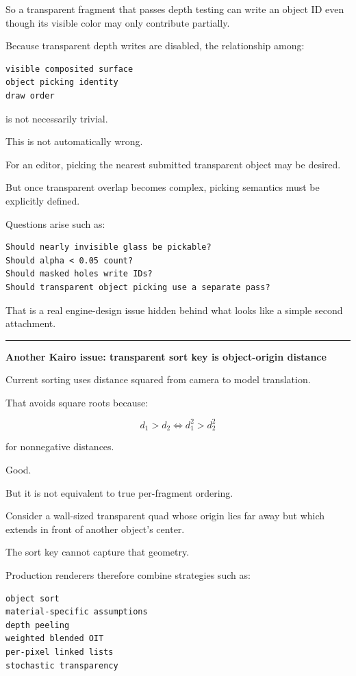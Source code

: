 So a transparent fragment that passes depth testing can write an object ID even though its visible color may only contribute partially.

Because transparent depth writes are disabled, the relationship among:

\begin{verbatim}
visible composited surface
object picking identity
draw order
\end{verbatim}

is not necessarily trivial.

This is not automatically wrong.

For an editor, picking the nearest submitted transparent object may be desired.

But once transparent overlap becomes complex, picking semantics must be explicitly defined.

Questions arise such as:

\begin{verbatim}
Should nearly invisible glass be pickable?
Should alpha < 0.05 count?
Should masked holes write IDs?
Should transparent object picking use a separate pass?
\end{verbatim}

That is a real engine-design issue hidden behind what looks like a simple second attachment.

\begin{center}\rule{0.5\linewidth}{0.5pt}\end{center}

\textbf{Another Kairo issue: transparent sort key is object-origin distance}

Current sorting uses distance squared from camera to model translation.

That avoids square roots because:

\[
d_1>d_2
\iff
d_1^2>d_2^2
\]

for nonnegative distances.

Good.

But it is not equivalent to true per-fragment ordering.

Consider a wall-sized transparent quad whose origin lies far away but which extends in front of another object's center.

The sort key cannot capture that geometry.

Production renderers therefore combine strategies such as:

\begin{verbatim}
object sort
material-specific assumptions
depth peeling
weighted blended OIT
per-pixel linked lists
stochastic transparency
\end{verbatim}

